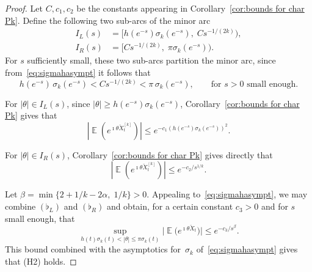 \documentclass[10pt,a4paper]{amsart}
\DeclareMathOperator{\E}{\mathbb{E}}
\begin{document}
\begin{proof}
Let $C, c_1, c_2$ be the constants appearing in Corollary~\ref{cor:bounds for char Pk}. Define the following two
sub-arcs of the minor arc
\begin{align*}
I_L(s) &= \big[h(e^{-s})\sigma_k(e^{-s}),\; C s^{-1/(2k)}\big),\\
I_R(s) &= \big[C s^{-1/(2k)},\; \pi\sigma_k(e^{-s})\big).
\end{align*}
For $s$ sufficiently small, these two sub-arcs partition the minor arc, since from~\eqref{eq:sigmahasympt} it
follows that
\begin{equation}\label{eq:arcpartition}
h(e^{-s})\,\sigma_k(e^{-s}) < C s^{-1/(2k)} < \pi\,\sigma_k(e^{-s}), \qquad \text{for  } s>0 \text{ small enough}.
\end{equation}

For $|\theta|\in I_L(s)$, since $|\theta|\ge h(e^{-s})\sigma_k(e^{-s})$, Corollary~\ref{cor:bounds for char Pk} gives that
\begin{equation}\tag{$\flat_L$}
|\E(e^{\imath\theta\breve{X}^{[k]}_t})| \le e^{-c_1(h(e^{-s})\sigma_k(e^{-s}))^2}.
\end{equation}

For $|\theta|\in I_R(s)$, Corollary~\ref{cor:bounds for char Pk} gives directly that
\begin{equation}\tag{$\flat_R$}
|\E(e^{\imath\theta\breve{X}^{[k]}_t})| \le e^{-c_2/s^{1/k}}.
\end{equation}

Let $\beta = \min\{2+1/k-2\alpha,\; 1/k\} > 0$. Appealing to~\eqref{eq:sigmahasympt}, we may combine $(\flat_L)$ and
$(\flat_R)$ and obtain, for a certain constant $c_3>0$ and for $s$ small enough, that
\[
\sup_{h(t)\sigma_k(t)<|\theta|\le\pi\sigma_k(t)} \big|\E\!\big(e^{\imath\theta\breve{X}_t}\big)\big| \le e^{-c_3/s^{\beta}}.
\]
This bound combined with the asymptotics for~$\sigma_k$ of~\eqref{eq:sigmahasympt} gives that (H2) holds.
\end{proof}
\end{document}
